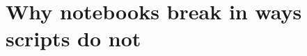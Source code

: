 \chapter{Why notebooks break in ways scripts do not}
\label{ch:why-notebooks-break-in-ways-scripts-do}

